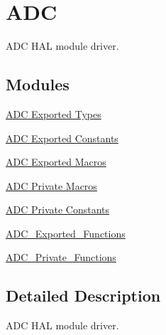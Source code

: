 \hypertarget{group___a_d_c}{\section{A\-D\-C}
\label{group___a_d_c}
}


A\-D\-C H\-A\-L module driver.  


\subsection*{Modules}
\begin{DoxyCompactItemize}
\item 
\hyperlink{group___a_d_c___exported___types}{A\-D\-C Exported Types}
\item 
\hyperlink{group___a_d_c___exported___constants}{A\-D\-C Exported Constants}
\item 
\hyperlink{group___a_d_c___exported___macros}{A\-D\-C Exported Macros}
\item 
\hyperlink{group___a_d_c___private___macros}{A\-D\-C Private Macros}
\item 
\hyperlink{group___a_d_c___private___constants}{A\-D\-C Private Constants}
\item 
\hyperlink{group___a_d_c___exported___functions}{A\-D\-C\-\_\-\-Exported\-\_\-\-Functions}
\item 
\hyperlink{group___a_d_c___private___functions}{A\-D\-C\-\_\-\-Private\-\_\-\-Functions}
\end{DoxyCompactItemize}


\subsection{Detailed Description}
A\-D\-C H\-A\-L module driver. 